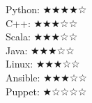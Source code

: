 
Python: ★★★★☆ \\
C++: ★★★☆☆ \\
Scala: ★★★☆☆ \\
Java: ★★★☆☆ \\
\spacer
Linux: ★★★☆☆ \\
Ansible: ★★★☆☆ \\
Puppet: ★☆☆☆☆ \\
